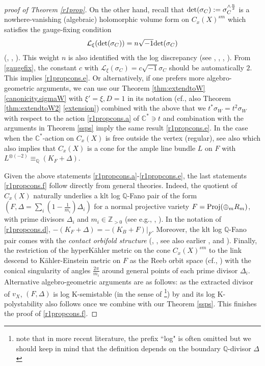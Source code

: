 \documentclass[12pt,a4paper]{amsart}
\theoremstyle{remark}
\theoremstyle{definition}
\def\C{\mathbb{C}}
\def\Z{\mathbb{Z}}
\def\Q{\mathbb{Q}}
\begin{document}
\begin{proof}[proof of Theorem \ref{r1prop}]
On the other hand, recall that 
${\rm det}(\sigma_C):=\sigma_C^{\wedge \frac{n}{2}}$ is a nowhere-vanishing (algebraic) 
holomorphic 
volume form on $C_x(X)^{sm}$ 
which satisfies the gauge-fixing condition 
\begin{align}\label{gaugefix}
\mathcal{L}_\xi({\rm det}(\sigma_C))=n\sqrt{-1}
{\rm det}(\sigma_C)
\end{align}
(\cite{MSY2}, \cite[\S 6]{CS2}, \cite{Li}). 
This weight $n$ is also identified with the log discrepancy 
(see \cite[3.1, 3.13]{Kol13}, \cite[\S 4]{LSs}, \cite{Li}, \cite[3.6]{LLX}). 
From \eqref{gaugefix}, the constant $c$ with 
$\mathcal{L}_\xi(\sigma_C)=c\sqrt{-1}\sigma_C$ 
should be automatically $2$. 
This implies \ref{r1propcons.e}. 
Or alternatively, if one prefers more algebro-geometric arguments, 
we can use our Theorem \ref{thm:extendtoW} \eqref{canonicity.sigmaW} with $\xi'=\xi, D=1$ in its notation (cf., also Theorem \ref{thm:extendtoW2} \eqref{extension}) combined with the above 
that we $t^* \sigma_W=t^2\sigma_W$ with respect to the action 
\ref{r1propcons.a} of $\C^*\ni t$ and combination with the arguments in Theorem 
\ref{ssps} imply the same result \ref{r1propcons.e}. 
In the case when the $\C^*$-action on $C_x(X)$ is free outside the vertex (regular), 
see also \cite[3.1, 3.14]{Kol13} which also implies that 
$C_x(X)$ is a cone for the ample line bundle $L$ on $F$ 
with $L^{\otimes (-2)}\equiv_\Q (K_F+\Delta)$. 

Given the above statements 
\ref{r1propcons.a}-\ref{r1propcons.e}, 
the last statements \ref{r1propcons.f} 
follow directly from general theories. 
Indeed, 
the quotient of $C_x(X)$ 
naturally underlies a 
klt log $\Q$-Fano pair of the form 
$(F,\Delta=\sum_{i}(1-\frac{1}{m_i})\Delta_i)$ 
for a normal projective variety $F={\rm Proj}(\oplus_m R_m)$, with 
prime divisors $\Delta_i$ and $m_i\in \Z_{>0}$ 
(see e.g., \cite[\S 1, Lemma]{Namd}, \cite[\S 3.1, \S 9.4]{Kol13}). 
In the notation of 
\ref{r1propcons.d}, 
$-(K_F+\Delta)=-(K_B+F)|_F$. 
Moreover, the klt log $\Q$-Fano pair 
comes with the 
{\it contact orbifold structure} 
(\cite[4.4.1]{Name}, \cite[\S 2]{Namf}, see also 
earlier \cite[\S 2]{Le}, \cite[C.16]{Buc} and \cite{Smi}). 
Finally, the restriction of the 
hyperK\"ahler metric on the cone $C_x(X)^{sm}$ to the link descend to 
K\"ahler-Einstein metric on $F$ 
as the Reeb orbit space (cf., 
\cite{BoyerGalicki}) with the conical 
singularity of angles $\frac{2\pi}{m_i}$ 
around general points of each prime divisor 
$\Delta_i$. Alternative algebro-geometric  
arguments are as follows: 
as the extracted divisor of $v_X$, 
$(F,\Delta)$ is 
log K-semistable 
(in the sense of \cite{Don11, OS}
\footnote{note that in more recent literature, the prefix ``log" is 
often omitted but we should keep in mind that the definition 
depends on the boundary $\Q$-divisor $\Delta$}) 
by \cite{LX} and its log K-polystability 
also follows once we combine with 
our Theorem \ref{ssps}. This finishes the proof of \ref{r1propcons.f}. 


\end{proof}
\end{document}

